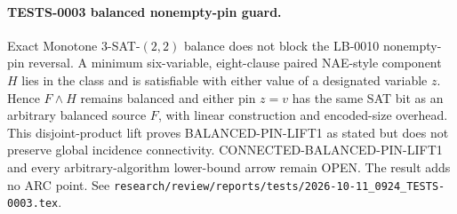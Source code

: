 \paragraph{TESTS-0003 balanced nonempty-pin guard.}
Exact Monotone $3$-SAT-$(2,2)$ balance does not block the LB-0010
nonempty-pin reversal.  A minimum six-variable, eight-clause paired
NAE-style component $H$ lies in the class and is satisfiable with either
value of a designated variable $z$.  Hence $F\wedge H$ remains balanced and
either pin $z=v$ has the same SAT bit as an arbitrary balanced source $F$,
with linear construction and encoded-size overhead.  This disjoint-product
lift proves BALANCED-PIN-LIFT1 as stated but does not preserve global
incidence connectivity.  CONNECTED-BALANCED-PIN-LIFT1 and every
arbitrary-algorithm lower-bound arrow remain OPEN.  The result adds no ARC
point.  See
\texttt{research/review/reports/tests/2026-10-11\_0924\_TESTS-0003.tex}.

